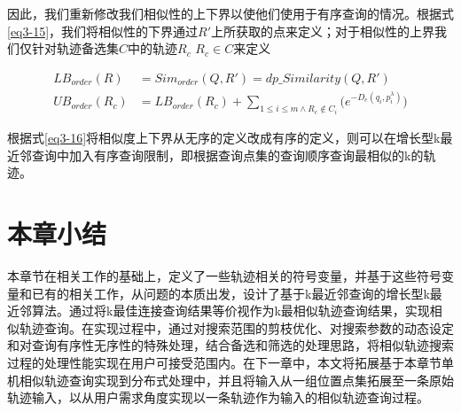 因此，我们重新修改我们相似性的上下界以使他们使用于有序查询的情况。根据式\ref{eq3-15}，我们将相似性的下界通过$R'$上所获取的点来定义；对于相似性的上界我们仅针对轨迹备选集$C$中的轨迹$R_c$ $R_c \in C$来定义

\begin{equation}
\label{eq3-16}
\begin{split}
LB_{order}(R) & = Sim_{order}(Q, R') = dp\_Similarity(Q,R')\\
UB_{order}(R_c) & = LB_{order}(R_c) + \sum_{1\leq i\leq m\wedge R_c\notin C_i}\big( e^{-D_{e}(q_i, p_i^\lambda)} \big)
\end{split}
\end{equation}

根据式\ref{eq3-16}将相似度上下界从无序的定义改成有序的定义，则可以在增长型k最近邻查询中加入有序查询限制，即根据查询点集的查询顺序查询最相似的k的轨迹。

\section{本章小结}
\label{sec:implementation conclusion}
本章节在相关工作的基础上，定义了一些轨迹相关的符号变量，并基于这些符号变量和已有的相关工作，从问题的本质出发，设计了基于k最近邻查询的增长型k最近邻算法。通过将k最佳连接查询结果等价视作为k最相似轨迹查询结果，实现相似轨迹查询。在实现过程中，通过对搜索范围的剪枝优化、对搜索参数的动态设定和对查询有序性无序性的特殊处理，结合备选和筛选的处理思路，将相似轨迹搜索过程的处理性能实现在用户可接受范围内。在下一章中，本文将拓展基于本章节单机相似轨迹查询实现到分布式处理中，并且将输入从一组位置点集拓展至一条原始轨迹输入，以从用户需求角度实现以一条轨迹作为输入的相似轨迹查询过程。
